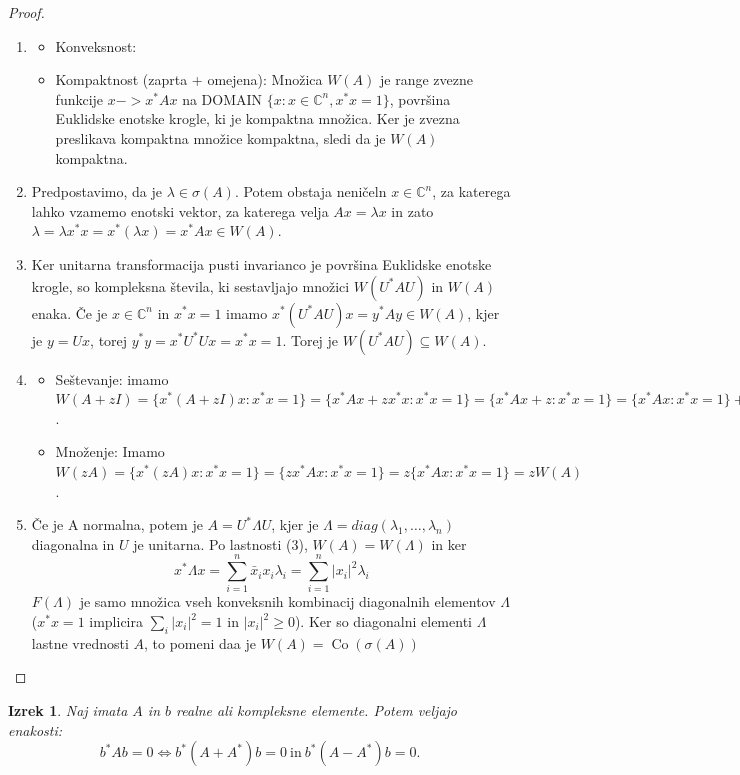 \documentclass[12pt,a4paper]{amsart}
\theoremstyle{definition}
\theoremstyle{plain}
\newtheorem{izrek}[definicija]{Izrek}
\newcommand{\Co}{\operatorname{Co}} %
\newcommand{\C}{\mathbb C}
\begin{document}
\begin{proof}
\begin{enumerate}
\item
\begin{itemize}
\item Konveksnost: 
\item Kompaktnost (zaprta + omejena): Množica $W(A)$ je range zvezne funkcije $x -> x^\ast Ax$ na DOMAIN $\{x:x\in \C^n , x^\ast x=1\}$, površina Euklidske enotske krogle, ki je kompaktna množica. Ker je zvezna preslikava kompaktna množice kompaktna, sledi da je $W(A)$ kompaktna.
\end{itemize}
\item Predpostavimo, da je $\lambda \in \sigma(A)$. Potem obstaja neničeln $x\in \C ^n$, za katerega lahko vzamemo enotski vektor, za katerega velja $Ax=\lambda x$ in zato $\lambda = \lambda x^\ast x=x^\ast (\lambda x) = x^\ast Ax \in W(A)$.
\item Ker unitarna transformacija pusti invarianco je površina Euklidske enotske krogle, so kompleksna števila, ki sestavljajo množici $W(U^\ast AU)$ in $W(A)$ enaka. Če je $x\in \C^n$ in $x^\ast x=1$ imamo $x^\ast (U^\ast AU)x=y^\ast Ay \in W(A)$, kjer je $y = Ux$, torej $y^\ast y=x^\ast U^\ast Ux=x^\ast x=1$. Torej je $W(U^\ast AU)\subseteq W(A)$. 
\item 
\begin{itemize}
\item Seštevanje: imamo $W(A +zI)=\{x^\ast (A+zI)x: x^\ast x=1\} = \{x^\ast Ax + zx^\ast x: x^\ast x =1\} = \{x^\ast Ax + z: x^\ast x=1\} = \{x^\ast Ax: x^\ast x=1\} +z = W(A) +z$.
\item Množenje: Imamo $W(zA) = \{x^\ast (zA)x: x^\ast x=1\} = \{zx^\ast Ax:x^\ast x =1\} = z\{x^\ast Ax:x^\ast x=1\} = zW(A)$.
\end{itemize}
\item Če je A normalna, potem je $A=U^\ast \Lambda U$, kjer je $\Lambda = diag(\lambda_1, \dots, \lambda_n)$ diagonalna in $U$ je unitarna. Po lastnosti (3), $W(A)=W(\Lambda)$ in ker $$x^\ast \Lambda x = \sum_{i=1}^{n} \bar{x}_i x_i\lambda_i = \sum_{i=1}^{n} |x_i|^2 \lambda_i$$ $F(\Lambda)$ je samo množica vseh konveksnih kombinacij diagonalnih elementov $\Lambda$ ($x^\ast x=1$ implicira $\sum_{i} |x_i|^2 =1$ in $|x_i|^2 \geq 0$). Ker so diagonalni elementi $\Lambda$ lastne vrednosti $A$, to pomeni daa je $W(A) =\Co(\sigma(A))$

\end{enumerate}
\end{proof}
\begin{izrek}
Naj imata $A$ in $b$ realne ali kompleksne elemente. Potem veljajo enakosti:
$$b^\ast Ab=0\Leftrightarrow b^\ast (A+A^\ast)b=0 \ \textrm{in}\  b^\ast(A-A^\ast)b=0.$$
\end{izrek}
\end{document}
